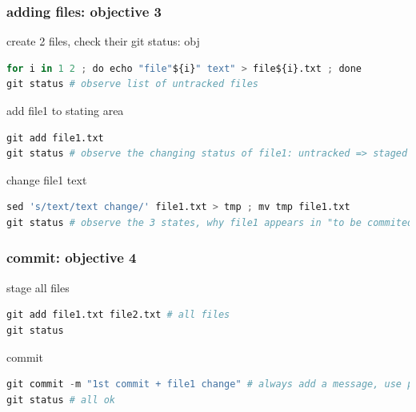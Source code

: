 \begin{frame}[containsverbatim]
\frametitle{ adding files: objective 3}
\begin{exampleblock}{create 2 files, check their git status: obj}
\begin{lstlisting}[language=python]
for i in 1 2 ; do echo "file"${i}" text" > file${i}.txt ; done
git status # observe list of untracked files
\end{lstlisting}
\end{exampleblock}
\begin{exampleblock}{add file1 to stating area}
\begin{lstlisting}[language=python]
git add file1.txt
git status # observe the changing status of file1: untracked => staged
\end{lstlisting}
\end{exampleblock}
\begin{exampleblock}{change file1 text}
\begin{lstlisting}[language=python]
sed 's/text/text change/' file1.txt > tmp ; mv tmp file1.txt
git status # observe the 3 states, why file1 appears in "to be commited" and also in "not staged for commit"?
\end{lstlisting}
\end{exampleblock}
\end{frame}
\begin{frame}[containsverbatim]
\frametitle{ commit: objective 4}
\begin{exampleblock}{stage all files}
\begin{lstlisting}[language=python]
git add file1.txt file2.txt # all files
git status
\end{lstlisting}
\end{exampleblock}
\begin{exampleblock}{commit}
\begin{lstlisting}[language=python]
git commit -m "1st commit + file1 change" # always add a message, use present time to explain the change
git status # all ok
\end{lstlisting}
\end{exampleblock}
\end{frame}
